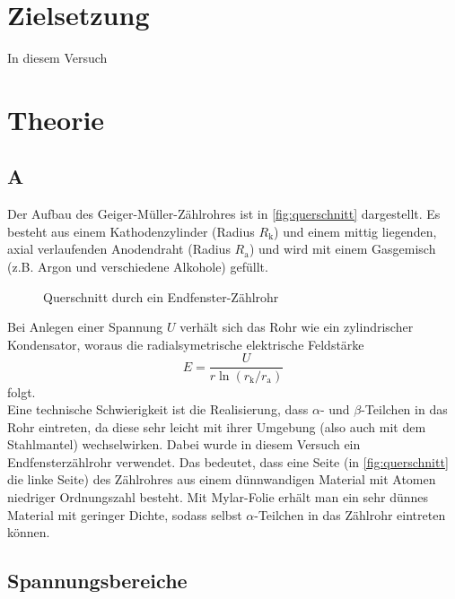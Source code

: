 \section*{Zielsetzung}
\label{sec:zielsetzung}

In diesem Versuch 

\section{Theorie}
\label{sec:Theorie}


\subsection{A}
\label{sec:a}

Der Aufbau des Geiger-Müller-Zählrohres ist in \autoref{fig:querschnitt} dargestellt. Es besteht aus
einem Kathodenzylinder (Radius $R_\text{k}$) und einem mittig liegenden, axial verlaufenden
Anodendraht (Radius $R_\text{a}$) und wird mit einem Gasgemisch (z.B. Argon und verschiedene Alkohole) gefüllt.
\begin{figure}[H]
	\centering
	\caption{Querschnitt durch ein Endfenster-Zählrohr \cite{sample}}
	\label{fig:querschnitt}
\end{figure}
\noindent
Bei Anlegen einer Spannung $U$ verhält sich das Rohr wie ein zylindrischer Kondensator, woraus die 
radialsymetrische elektrische Feldstärke
\begin{equation}
	E = \frac{U}{r \ln(r_\text{k} / r_\text{a})}
	\label{eqn:elektrisches-feld}
\end{equation}
folgt.
\\
Eine technische Schwierigkeit ist die Realisierung, dass $\alpha$- und
$\beta$-Teilchen in das Rohr eintreten, da diese sehr leicht mit ihrer Umgebung (also auch mit dem Stahlmantel)
wechselwirken. Dabei wurde in diesem
Versuch ein Endfensterzählrohr verwendet. Das bedeutet, dass eine Seite (in \autoref{fig:querschnitt} die linke
Seite) des Zählrohres aus einem dünnwandigen Material mit Atomen niedriger Ordnungszahl besteht. Mit Mylar-Folie 
erhält man ein sehr dünnes Material mit geringer Dichte, sodass selbst $\alpha$-Teilchen in das Zählrohr eintreten 
können.

\subsection{Spannungsbereiche}
\label{sec:spannungsbereiche}

